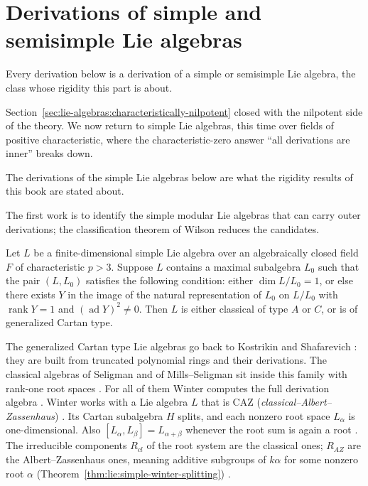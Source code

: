 \section{Derivations of simple and semisimple Lie algebras}\label{sec:lie-algebras:simple}

Every derivation below is a derivation of a simple or semisimple Lie algebra, the class whose rigidity this part is about.

Section~\ref{sec:lie-algebras:characteristically-nilpotent} closed with
the nilpotent side of the theory.  We now return to simple Lie algebras,
this time over fields of positive characteristic, where the
characteristic-zero answer ``all derivations are inner'' breaks down.

The derivations of the simple Lie algebras below are what the rigidity results of this book are stated about.

The first work is to identify the simple modular Lie algebras that can
carry outer derivations; the classification theorem of Wilson
\cite[Theorem~1, pp.~418--419]{Wilson1976} reduces the candidates.

\begin{theorem}\label{thm:lie:simple-wilson-classification}
Let $L$ be a finite-dimensional simple Lie algebra over an algebraically
closed field $F$ of characteristic $p>3$.  Suppose $L$ contains a maximal
subalgebra $L_{0}$ such that the pair $(L,L_{0})$ satisfies the following
condition: either $\dim L/L_{0}=1$, or else there exists $Y$ in the image
of the natural representation of $L_{0}$ on $L/L_{0}$ with
$\operatorname{rank} Y=1$ and $(\operatorname{ad} Y)^{2}\neq 0$.  Then $L$
is either classical of type $A$ or $C$, or is of generalized Cartan type.
\end{theorem}

The generalized Cartan type Lie algebras go back to Kostrikin and
Shafarevich \cite[p.~418]{Wilson1976}: they are built from truncated
polynomial rings and their derivations.  The classical algebras of
Seligman and of Mills--Seligman sit inside this family with rank-one
root spaces \cite[p.~962]{Winter1984}.  For all of them Winter computes
the full derivation algebra
\cite[Theorems~3.4 and 3.6, pp.~970--971]{Winter1984}.
Winter works with a Lie algebra $L$ that is CAZ
(\emph{classical--Albert--Zassenhaus}) \cite[p.~962]{Winter1984}.
Its Cartan subalgebra $H$ splits, and
each nonzero root space $L_{\alpha}$ is one-dimensional.
Also $[L_{\alpha},L_{\beta}]=L_{\alpha+\beta}$ whenever the root sum is again
a root \cite[p.~962]{Winter1984}.
The irreducible components
$R_{cl}$ of the root system are the classical ones; $R_{AZ}$ are the
Albert--Zassenhaus ones, meaning additive subgroups of $k\alpha$ for some
nonzero root $\alpha$ (Theorem~\ref{thm:lie:simple-winter-splitting}) \cite[p.~962]{Winter1984}.

